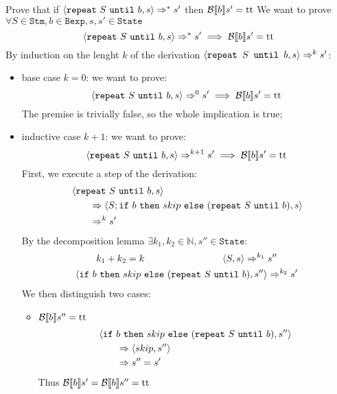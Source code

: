 \begin{exercise}{
    Prove that if $\left<\texttt{repeat}\ S\ \texttt{until}\ b, s\right> \Rightarrow^* s'$ then $\mathcal{B} \llbracket b \rrbracket s' = \text{tt}$ \vspace*{0.4cm}
}
    We want to prove $\forall S \in \texttt{Stm}, b \in \texttt{Bexp}, s, s' \in \texttt{State}$
    \[ \left<\texttt{repeat}\ S\ \texttt{until}\ b, s\right> \Rightarrow^* s' \implies \mathcal{B} \llbracket b \rrbracket s' = \text{tt} \]
    By induction on the lenght $k$ of the derivation $\left<\texttt{repeat } S \texttt{ until } b, s\right> \Rightarrow^k s'$:
    \begin{itemize}
        \item base case $k=0$: we want to prove:
            \[ \left<\texttt{repeat}\ S\ \texttt{until}\ b, s\right> \Rightarrow^0 s' \implies \mathcal{B} \llbracket b \rrbracket s' = \text{tt} \]
            The premise is trivially false, so the whole implication is true;
        \item inductive case $k+1$: we want to prove:
            \[ \left<\texttt{repeat}\ S\ \texttt{until}\ b, s\right> \Rightarrow^{k+1} s' \implies \mathcal{B} \llbracket b \rrbracket s' = \text{tt} \]
            First, we execute a step of the derivation:
            \begin{align*}
                &\left<\texttt{repeat}\ S\ \texttt{until}\ b, s\right>
                \\&\qquad \Rightarrow \left<S; \texttt{if}\ b\ \texttt{then}\ skip\ \texttt{else}\ (\texttt{repeat}\ S\ \texttt{until}\ b), s\right>
                \\&\qquad \Rightarrow^k s'
            \end{align*}
            By the decomposition lemma $\exists k_1, k_2 \in \mathbb{N}, s'' \in \texttt{State} :$
            \begin{gather*}
                k_1 + k_2 = k \qquad\qquad\qquad\qquad
                \left<S, s\right> \Rightarrow^{k_1} s'' \\
                \left<\texttt{if}\ b\ \texttt{then}\ skip\ \texttt{else}\ (\texttt{repeat}\ S\ \texttt{until}\ b), s''\right> \Rightarrow^{k_2} s'
            \end{gather*}
            We then distinguish two cases:
            \begin{itemize}
                \item $\mathcal{B} \llbracket b \rrbracket s'' = \text{tt}$
                    \begin{align*}
                        &\left<\texttt{if}\ b\ \texttt{then}\ skip\ \texttt{else}\ (\texttt{repeat}\ S\ \texttt{until}\ b), s''\right>
                        \\&\qquad \Rightarrow \left<skip, s''\right>
                        \\&\qquad \Rightarrow s'' = s'
                    \end{align*}
                    Thus $\mathcal{B} \llbracket b \rrbracket s' = \mathcal{B} \llbracket b \rrbracket s'' = \text{tt}$

\end{itemize}
\end{itemize}
\end{exercise}
